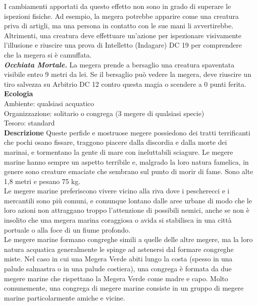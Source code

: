 \begin{multicols}{2}
I cambiamenti apportati da questo effetto non sono in grado di superare le ispezioni fisiche. Ad esempio, la megera potrebbe apparire come una creatura priva di artigli, ma una persona in contatto con le sue mani li avvertirebbe. Altrimenti, una creatura deve effettuare un'azione per ispezionare visivamente l'illusione e riuscire una prova di Intelletto (Indagare) DC  19 per comprendere che la megera si è camuffata.\\

\emph{\textbf{Occhiata Mortale.}} La megera prende a bersaglio una creatura spaventata visibile entro 9 metri da lei. Se il bersaglio può vedere la megera, deve riuscire un tiro salvezza su Arbitrio DC  12 contro questa magia o scendere a 0 punti ferita.
\textbf{Ecologia}\\
Ambiente: qualsiasi acquatico\\
Organizzazione: solitario o congrega (3 megere di qualsiasi specie)\\
Tesoro: standard\\
\textbf{Descrizione}
Queste perfide e mostruose megere possiedono dei tratti terrificanti che pochi osano fissare, traggono piacere dalla discordia e dalla morte dei marinai, e tormentano la gente di mare con ineluttabili sciagure. Le megere marine hanno sempre un aspetto terribile e, malgrado la loro natura famelica, in genere sono creature emaciate che sembrano sul punto di morir di fame. Sono alte 1,8 metri e pesano 75 kg.\\

Le megere marine preferiscono vivere vicino alla riva dove i pescherecci e i mercantili sono più comuni, e comunque lontano dalle aree urbane di modo che le loro azioni non attraggano troppo l’attenzione di possibili nemici, anche se non è insolito che una megera marina coraggiosa o avida si stabilisca in una città portuale o alla foce di un fiume profondo.\\

Le megere marine formano congreghe simili a quelle delle altre megere, ma la loro natura acquatica generalmente le spinge ad astenersi dal formare congreghe miste. Nel caso in cui una Megera Verde abiti lungo la costa (spesso in una palude salmastra o in una palude costiera), una congrega è formata da due megere marine che rispettano la Megera Verde come madre e capo. Molto comunemente, una congrega di megere marine consiste in un gruppo di megere marine particolarmente amiche e vicine.\\


\end{multicols}
